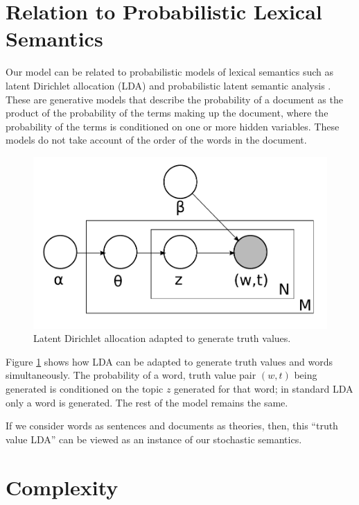\documentclass[11pt]{article}
\theoremstyle{definition}
\begin{document}
\section{Relation to Probabilistic Lexical Semantics}


Our model can be related to probabilistic models of lexical semantics
such as latent Dirichlet allocation (LDA) \cite{Blei:03} and
probabilistic latent semantic analysis \cite{Hofmann:99}. These are
generative models that describe the probability of a document as the
product of the probability of the terms making up the document, where
the probability of the terms is conditioned on one or more hidden
variables. These models do not take account of the order of the words
in the document.

\begin{figure}
\includegraphics[width=\linewidth]{LDA.pdf}
\caption{Latent Dirichlet allocation adapted to generate truth values.}
\label{figure:lda}
\end{figure}

Figure \ref{figure:lda} shows how LDA can be adapted to generate truth
values and words simultaneously. The probability of a word, truth
value pair $(w,t)$ being generated is conditioned on the topic $z$
generated for that word; in standard LDA only a word is generated. The
rest of the model remains the same.

If we consider words as sentences and documents as theories, then,
this ``truth value LDA'' can be viewed as an instance of our
stochastic semantics.

\section{Complexity}
\end{document}
